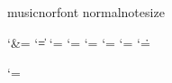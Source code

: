 \def\C@tx{\edef\savenu@iv{\the\y@iv}%
  \ifnum\noinstrument= 1 \y@iv\staffbotmarg
  \else
    \advance\noinstrument -1\relax
    \y@iv\csname interinstrument\romannumeral\noinstrument\endcsname
    \C@Inter \advance\y@iv\stem@skip \divide\y@iv 2
    \advance\noinstrument 1
  \fi
  \advance\y@iv-\csname T@R\romannumeral\noinstrument\endcsname
  \edef\lower@dim{\the\y@iv}\relax \y@iv\savenu@iv\relax
  \lower\lower@dim\uplap}

\def\C@Inter{\stem@skip\interportee \advance\stem@skip-8\internote
  \ifnum\stafflinesnb=4 \advance\stem@skip 2\internote \fi
  \ifnum\stafflinesnb=6  \advance\stem@skip-2\internote \fi}
 

\let\wlog=\@plainwlog
\def\interfacteur{1}%
\csname musicnorfont\endcsname
\def\nbinstruments{\maxinstruments}\savemeter
\csname normalnotesize\endcsname
\normal  %
\resetfacteurs
\def\nbinstruments{0}%
\def\magstep#1{\ifcase#1 \@m\or 1200\or 1440\or 1728\or 2074\or
 2488\or 2986\or 3583\or 4300\or 5160\fi\relax}

\def\endcatcodesmusic{\catcode`\&=\catcode@and
\catcode`\|=\catcode@vert
\catcode`\>=\catcode@gt
\catcode`\<=\catcode@lt
\catcode`\!=\catcode@excl
\catcode`\*=\catcode@star
\catcode`\:=\catcode@sc
\catcode`\.=\catcode@pt
\catcodesmusicfalse}

\endcatcodesmusic

\catcode`\@=\catcodeat
\def\musictexactive{\relax}
\endinput

